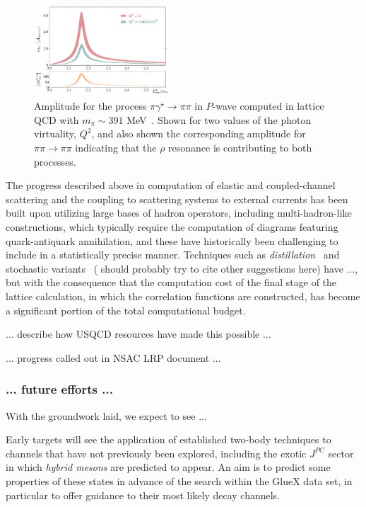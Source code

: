 {\begin{figure}
\includegraphics[width=0.45\textwidth]{dudek/rho_pi_gamma}
\caption{Amplitude for the process ${\pi \gamma^\star \to \pi\pi}$ in $P$-wave computed in lattice QCD with $m_\pi \sim 391$ MeV~\cite{Briceno:2016kkp,Briceno:2015dca}. Shown for two values of the photon virtuality, $Q^2$, and also shown the corresponding amplitude for $\pi\pi \to \pi \pi$ indicating that the $\rho$ resonance is contributing to both processes.  }
\label{rhopigamma}
\end{figure}


The progress described above in computation of elastic and coupled-channel scattering and the coupling to scattering systems to external currents has been built upon utilizing large bases of hadron operators, including multi-hadron-like constructions, which typically require the computation of diagrams featuring quark-antiquark annihilation, and these have historically been challenging to include in a statistically precise manner. Techniques such as \emph{distillation}~\cite{Peardon:2009gh} and stochastic variants~\cite{Morningstar:2011ka} {\color{red}( should probably try to cite other suggestions here)} have {\color{red}...}, but with the consequence that the computation cost of the final stage of the lattice calculation, in which the correlation functions are constructed, has become a significant portion of the total computational budget.

{\color{red} ... describe how USQCD resources have made this possible ... }

{\color{red} ... progress called out in NSAC LRP document ... }


\subsubsection{... future efforts ...}

With the groundwork laid, we expect to see ...

Early targets will see the application of established two-body techniques to channels that have not previously been explored, including the exotic $J^{PC}$ sector in which \emph{hybrid mesons} are predicted to appear. An aim is to predict some properties of these states in advance of the search within the GlueX data set, in particular to offer guidance to their most likely decay channels.


}
